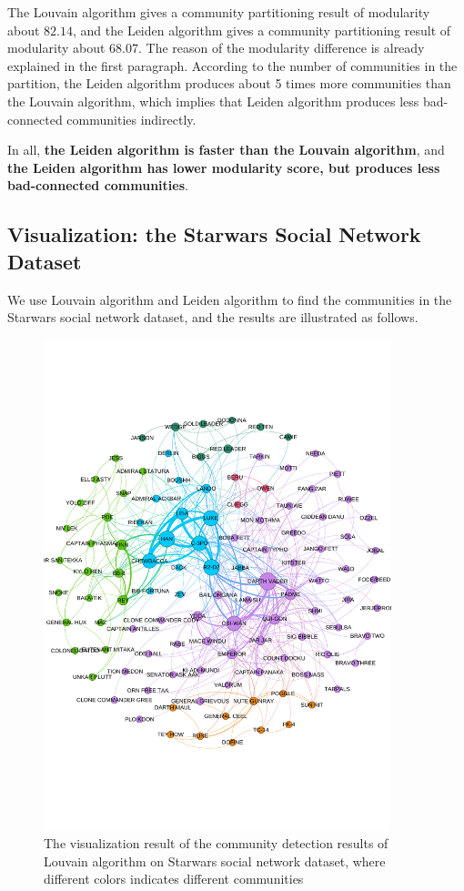 \documentclass[12pt, a4paper]{article}
\theoremstyle{definition}
\begin{document}
The Louvain algorithm gives a community partitioning result of modularity about $82.14$, and the Leiden algorithm gives a community partitioning result of modularity about $68.07$. The reason of the modularity difference is already explained in the first paragraph. According to the number of communities in the partition, the Leiden algorithm produces about 5 times more communities than the Louvain algorithm, which implies that Leiden algorithm produces less bad-connected communities indirectly.

In all, \textbf{the Leiden algorithm is faster than the Louvain algorithm}, and \textbf{the Leiden algorithm has lower modularity score, but produces less bad-connected communities}.

\subsection{Visualization: the Starwars Social Network Dataset}

We use Louvain algorithm and Leiden algorithm to find the communities in the Starwars social network dataset, and the results are illustrated as follows.

\begin{figure}[htbp]
	\centering
	\includegraphics[width=0.9\textwidth]{3.pdf}
	\caption{The visualization result of the community detection results of Louvain algorithm on Starwars social network dataset, where different colors indicates different communities}
	\label{fig3}
\end{figure}
\end{document}
